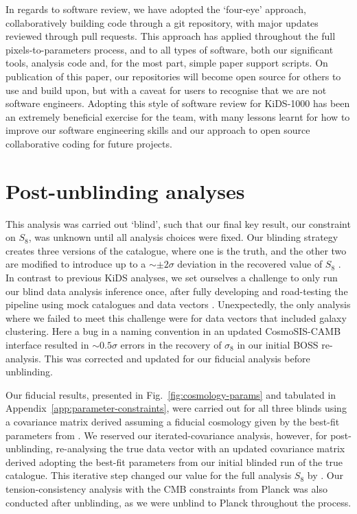\begin{appendix}
In regards to software review, we have adopted the `four-eye' approach, collaboratively building code through a git repository, with major updates reviewed through pull requests.   This approach has applied throughout the full pixels-to-parameters process, and to all types of software, both our significant tools, analysis code and, for the most part, simple paper support scripts.  On publication of this paper, our repositories will become open source for others to use and build upon, but with a caveat for users to recognise that we are not software engineers.   Adopting this style of software review for KiDS-1000 has been an extremely beneficial exercise for the team, with many lessons learnt for how to improve our software engineering skills and our approach to open source collaborative coding for future projects.     

\section{Post-unblinding analyses}
\label{app:unblinding}
This analysis was carried out `blind',  such that our final key result, our constraint on $S_8$, was unknown until all analysis choices were fixed.   Our blinding strategy creates three versions of the catalogue, where one is the truth, and the other two are modified to introduce up to a $\sim \pm 2\sigma$ deviation in the recovered value of $S_8$ \citep{kuijken/etal:2015, giblin/etal:inprep}.   In contrast to previous KiDS analyses, we set ourselves a challenge to only run our blind data analysis inference once, after fully developing and road-testing the pipeline using mock catalogues and data vectors \citep{joachimi/etal:inprep}.     Unexpectedly, the only analysis where we failed to meet this challenge were for data vectors that included galaxy clustering.   Here a bug in a naming convention in an updated {\sc CosmoSIS-CAMB} interface resulted in $\sim 0.5\sigma$ errors in the recovery of $\sigma_8$ in our initial BOSS re-analysis.  This was corrected and updated for our fiducial analysis before unblinding.

Our fiducial results, presented in Fig.~\ref{fig:cosmology-params} and tabulated in Appendix~\ref{app:parameter-constraints}, were carried out for all three blinds using a covariance matrix derived assuming a fiducial cosmology given by the best-fit parameters from \citet{troester/etal:2020}.  We reserved our iterated-covariance analysis, however, for post-unblinding, re-analysing the true data vector with an updated covariance matrix derived adopting the best-fit parameters from our initial blinded run of the true catalogue.   This iterative step changed our value for the full \tttp analysis $S_8$ by .   Our tension-consistency analysis with the CMB constraints from Planck was also conducted after unblinding, as we were unblind to Planck throughout the process.


\end{appendix}
